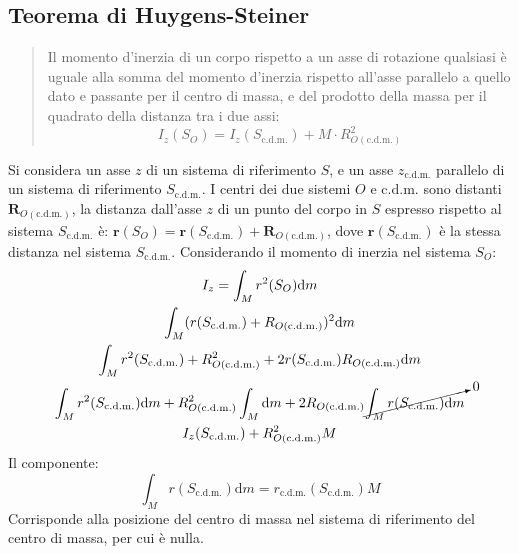 \documentclass{article}
\newcommand{\vect}[1]{\boldsymbol{\mathbf{#1}}}
\newcommand{\df}{\mathrm{d}}
\numberwithin{equation}{subsection}
\begin{document}
\subsection{Teorema di Huygens-Steiner}
\begin{quotation}
    Il momento d'inerzia di un corpo rispetto a un asse di 
    rotazione qualsiasi è uguale alla somma del momento d'inerzia rispetto all'asse parallelo a quello dato e 
    passante per il centro di massa, e del prodotto della massa 
    per il quadrato della distanza tra i due assi:
    \begin{equation}
        I_z(S_O)=I_z(S_{\mathrm{c.d.m.}})+M\cdot R^2_{O(\mathrm{c.d.m.})}
    \end{equation}
\end{quotation}
Si considera un asse $z$ di un sistema di riferimento $S$, e 
un asse $z_{\mathrm{c.d.m.}}$ parallelo di un sistema di riferimento $S_{\mathrm{c.d.m.}}$. 
I centri dei due sistemi $O$ e $\mathrm{c.d.m.}$ sono distanti $\vect{R}_{O(\mathrm{c.d.m.})}$, 
la distanza dall'asse $z$ di un punto del corpo in $S$ espresso rispetto al 
sistema $S_{\mathrm{c.d.m.}}$ è: $\vect{r}(S_O)=\vect{r}(S_{\mathrm{c.d.m.}})+\vect{R}_{O(\mathrm{c.d.m.})}$,  
dove $\vect{r}(S_{\mathrm{c.d.m.}})$ è la stessa distanza nel sistema $S_{\mathrm{c.d.m.}}$. 
Considerando il momento di inerzia nel sistema $S_O$: 
\begin{gather*}
    I_z=\displaystyle\int_M {r}^2(S_O)\df m\\
    \int_M({r}(S_{\mathrm{c.d.m.}})+{R}_{O(\mathrm{c.d.m.})})^2\df m\\
    \int_M r^2(S_{\mathrm{c.d.m.}})+R_{O(\mathrm{c.d.m.})}^2+2r(S_{\mathrm{c.d.m.}})R_{O(\mathrm{c.d.m.})}\df m\\
    \int_M r^2(S_{\mathrm{c.d.m.}})\df m+R_{O(\mathrm{c.d.m.})}^2\int_M \df m+2R_{O(\mathrm{c.d.m.})}\cancelto{0}{\int_Mr(S_{\mathrm{c.d.m.}})\df m}\\
    I_z(S_{\mathrm{c.d.m.}})+R_{O(\mathrm{c.d.m.})}^2M
\end{gather*}
Il componente:
\begin{equation*}
    \displaystyle\int_M r(S_{\mathrm{c.d.m.}})\df m=r_{\mathrm{c.d.m.}}(S_{\mathrm{c.d.m.}})M
\end{equation*}    
Corrisponde alla posizione del centro di massa nel sistema di riferimento del centro di massa, per cui è nulla. 
\end{document}
